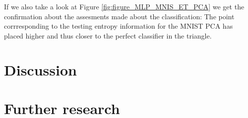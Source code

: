 If we also take a look at Figure \ref{fig:figure_MLP_MNIS_ET_PCA} we get the confirmation about the assesments made about the classification: The point corrresponding to the testing entropy information for the MNIST PCA has placed higher and thus closer to the perfect classifier in the triangle. \par

\section{Discussion}


\section{Further research}

